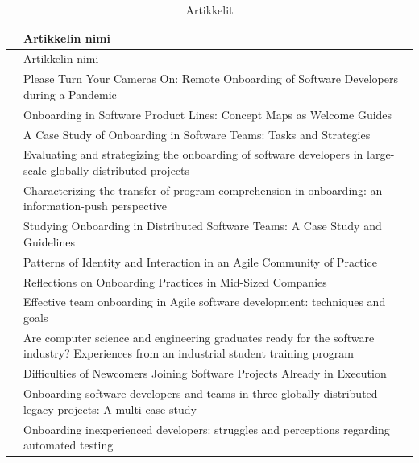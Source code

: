 \documentclass[utf8]{gradu3}
\begin{document}
\begin{footnotesize}
    \begin{longtable}{ m{4cm}  m{10.5cm} }
    \hline
        \hline
            & Artikkelin nimi \\
        \hline
    \endfirsthead

    \hline
        \hline
            & Artikkelin nimi \\
        \hline
    \endhead
 \hline
 \endfoot

 \caption{Artikkelit \label{tbl:artikkelit}}
 \endlastfoot

\textcite{rodeghero-ym-2021} & Please Turn Your Cameras On: Remote Onboarding of Software Developers during a Pandemic \\
\hline
\textcite{azanza-ym-2021} & Onboarding in Software Product Lines: Concept Maps as Welcome Guides \\
\hline
\textcite{ju-ym-2021} & A Case Study of Onboarding in Software Teams: Tasks and Strategies \\
\hline
\textcite{britto-ym-2020} & Evaluating and strategizing the onboarding of software developers in large-scale globally distributed projects\\
\hline
\textcite{yates-ym-2020} & Characterizing the transfer of program comprehension in onboarding: an information-push perspective\\
\hline
\textcite{moe-ym-2020} & Studying Onboarding in Distributed Software Teams: A Case Study and Guidelines \\
\hline
\textcite{kumar-wallace-2019} & Patterns of Identity and Interaction in an Agile Community of Practice \\
\hline
\textcite{viviani-murphy-2019} & Reflections on Onboarding Practices in Mid-Sized Companies \\
\hline
\textcite{buchan-ym-2019} & Effective team onboarding in Agile software development: techniques and goals \\
\hline
\textcite{tuzun-ym-2018} & Are computer science and engineering graduates ready for the software industry? Experiences from an industrial student training program \\
\hline
\textcite{matturro-ym-2017} & Difficulties of Newcomers Joining Software Projects Already in Execution \\
\hline
\textcite{britto-ym-2017} & Onboarding software developers and teams in three globally distributed legacy projects: A multi-case study \\
\hline
\textcite{pham-ym-2017} & Onboarding inexperienced developers: struggles and perceptions regarding automated testing \\

\end{longtable}
\end{footnotesize}
\end{document}
